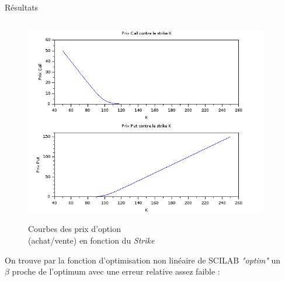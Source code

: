 \documentclass[final]{beamer}
\newlength{\onecolwid}
\newlength{\twocolwid}
\begin{document}
\begin{frame}[t]
\begin{columns}[t]
\begin{column}{\twocolwid}
\begin{block}{Résultats}
\begin{columns}[t,totalwidth=0.45\paperwidth]
\begin{column}{\onecolwid}
\begin{minipage}{1.49\textwidth}
\begin{figure}[!r]
  \vspace{-11.2cm}
  \hspace{-4cm}
  \includegraphics[scale=0.8]{callput.png}
  \label{callput}
  \caption{Courbes des prix d'option \\ (achat/vente) en fonction du \textit{Strike}}
\end{figure}
\end{minipage}
  On trouve par la fonction d'optimisation non linéaire de SCILAB \textit{"optim"} un $\beta$ proche de l'optimum avec une erreur relative assez faible :

\end{column} %

\begin{column}{\onecolwid} %



\end{column}
\end{columns}
\end{block}
\end{column}
\end{columns}
\end{frame}
\end{document}
